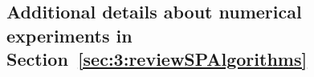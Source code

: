 





\subsection{Additional details about numerical experiments in Section~\ref{sec:3:reviewSPAlgorithms}}
\label{sub:3:additionalExperiments}

